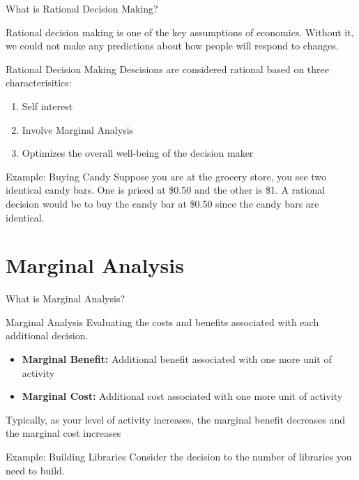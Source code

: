 \documentclass{beamer}
\begin{document}
\begin{frame}{What is Rational Decision Making?}

Rational decision making is one of the key assumptions of economics. Without it, we could not make any predictions about how people will respond to changes.

\begin{block}{Rational Decision Making}
Descisions are considered rational based on three characterisitics:
\begin{enumerate}
\item Self interest
\item Involve Marginal Analysis
\item Optimizes the overall well-being of the decision maker
\end{enumerate}
\end{block}

\begin{exampleblock}{Example: Buying Candy}
Suppose you are at the grocery store, you see two identical candy bars. One is priced at \$0.50 and the other is \$1. A rational decision would be to buy the candy bar at \$0.50 since the candy bars are identical.
\end{exampleblock}

\end{frame}

\section{Marginal Analysis}

\begin{frame}{What is Marginal Analysis?}

\begin{block}{Marginal Analysis}
Evaluating the costs and benefits associated with each additional decision.
\begin{itemize}
\item \textbf{Marginal Benefit:} Additional benefit associated with one more unit of activity
\item \textbf{Marginal Cost:} Additional cost associated with one more unit of activity
\end{itemize}

\end{block}

Typically, as your level of activity increases, the marginal benefit decreases and the marginal cost increases

\begin{exampleblock}{Example: Building Libraries}
Consider the decision to the number of libraries you need to build. 
\end{exampleblock}

\end{frame}
\end{document}

